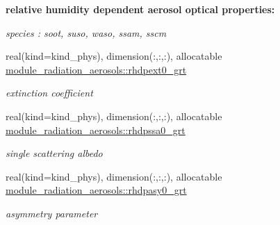 \begin{Indent}\textbf{ relative humidity dependent aerosol optical properties\+:}\par
{\em species \+: soot, suso, waso, ssam, sscm }\begin{DoxyCompactItemize}
\item 
real(kind=kind\+\_\+phys), dimension(\+:,\+:,\+:), allocatable \hyperlink{group__module__radiation__aerosols_ga35a5c7b67a3cf11c5016a693e115d384}{module\+\_\+radiation\+\_\+aerosols\+::rhdpext0\+\_\+grt}
\begin{DoxyCompactList}\small\item\em extinction coefficient \end{DoxyCompactList}\item 
real(kind=kind\+\_\+phys), dimension(\+:,\+:,\+:), allocatable \hyperlink{group__module__radiation__aerosols_ga40d680662eadf30221997dadcce734b1}{module\+\_\+radiation\+\_\+aerosols\+::rhdpssa0\+\_\+grt}
\begin{DoxyCompactList}\small\item\em single scattering albedo \end{DoxyCompactList}\item 
real(kind=kind\+\_\+phys), dimension(\+:,\+:,\+:), allocatable \hyperlink{group__module__radiation__aerosols_gab5a0bbefbfed6b393f0abad26e6e4d04}{module\+\_\+radiation\+\_\+aerosols\+::rhdpasy0\+\_\+grt}
\begin{DoxyCompactList}\small\item\em asymmetry parameter \end{DoxyCompactList}\end{DoxyCompactItemize}
\end{Indent}
